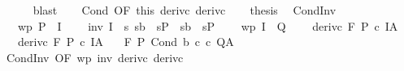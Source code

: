 \begin{isabellebody}
\ \ \ \ \isamarkupfalse%
\ blast\isanewline
\ \ \isamarkupfalse%
\ Cond\ {\isacharbrackleft}OF\ this\ deriv{\isacharunderscore}c{}\ deriv{\isacharunderscore}c{}{\isacharbrackright}\isanewline
\ \ \isamarkupfalse%
\ {\isacharquery}thesis\ \isacommand{{\isachardot}}\isamarkupfalse%
\isanewline
{}\isamarkupfalse%
%
\endisatagproof
{\isafoldproof}%
%
\isadelimproof
\isanewline
%
\endisadelimproof
\isanewline
{}\isamarkupfalse%
\ CondInv{\isacharprime}{\isacharcolon}\ \isanewline
\ \ \ wp{\isacharcolon}\ {\isachardoublequoteopen}P\ {\isasymsubseteq}\ I{\isachardoublequoteclose}\ \isanewline
\ \ \ inv{\isacharcolon}\ {\isachardoublequoteopen}I\ {\isasymsubseteq}\ {\isacharbraceleft}s{\isachardot}\ {\isacharparenleft}s{\isasymin}b\ {\isasymlongrightarrow}\ s{\isasymin}P\ {\isasymand}\ {\isacharparenleft}s{\isasymnotin}b\ {\isasymlongrightarrow}\ s{\isasymin}P\ \isanewline
\ \ \ wp{\isacharprime}{\isacharcolon}\ {\isachardoublequoteopen}I\ {\isasymsubseteq}\ Q{\isachardoublequoteclose}\ \isanewline
\ \ \ deriv{\isacharunderscore}c{}{\isacharcolon}\ {\isachardoublequoteopen}{\isasymGamma}{\isacharcomma}{\isasymTheta}{\isasymturnstile}\isactrlbsub {\isacharslash}F\isactrlesub \ P\ c\ I{\isacharcomma}A{\isachardoublequoteclose}\ \isanewline
\ \ \ deriv{\isacharunderscore}c{}{\isacharcolon}\ {\isachardoublequoteopen}{\isasymGamma}{\isacharcomma}{\isasymTheta}{\isasymturnstile}\isactrlbsub {\isacharslash}F\isactrlesub \ P\ c\ I{\isacharcomma}A{\isachardoublequoteclose}\isanewline
\ \ \ {\isachardoublequoteopen}{\isasymGamma}{\isacharcomma}{\isasymTheta}{\isasymturnstile}\isactrlbsub {\isacharslash}F\isactrlesub \ P\ {\isacharparenleft}Cond\ b\ c\ c\ Q{\isacharcomma}A{\isachardoublequoteclose}\isanewline
%
\isadelimproof
%
\endisadelimproof
%
\isatagproof
{}\isamarkupfalse%
\ {\isacharminus}\isanewline
\ \ \isamarkupfalse%
\ CondInv\ {\isacharbrackleft}OF\ wp\ inv\ deriv{\isacharunderscore}c{}\ deriv{\isacharunderscore}c{}{\isacharbrackright}\isanewline
\ \ \isamarkupfalse%

\end{isabellebody}
